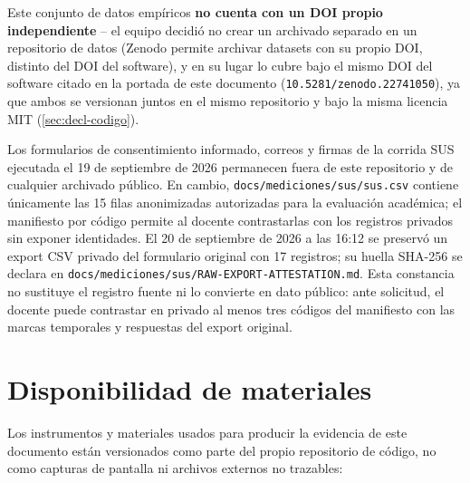Este conjunto de datos empíricos \textbf{no cuenta con un DOI propio
independiente} -- el equipo decidió no crear un archivado separado en
un repositorio de datos (Zenodo permite archivar datasets con su
propio DOI, distinto del DOI del software), y en su lugar lo cubre
bajo el mismo DOI del software citado en la portada de este documento
(\texttt{10.5281/zenodo.22741050}), ya que ambos se versionan juntos
en el mismo repositorio y bajo la misma licencia MIT
(\autoref{sec:decl-codigo}).

Los formularios de consentimiento informado, correos y firmas de la
corrida SUS ejecutada el 19 de septiembre de 2026 permanecen fuera de
este repositorio y de cualquier archivado público. En cambio,
\texttt{docs/mediciones/sus/sus.csv} contiene únicamente las 15 filas
anonimizadas autorizadas para la evaluación académica; el manifiesto por
código permite al docente contrastarlas con los registros privados sin
exponer identidades. El 20 de septiembre de 2026 a las 16:12 se preservó
un export CSV privado del formulario original con 17 registros; su huella
SHA-256 se declara en
\texttt{docs/mediciones/sus/RAW-EXPORT-ATTESTATION.md}. Esta constancia no
sustituye el registro fuente ni lo convierte en dato público: ante
solicitud, el docente puede contrastar en privado al menos tres códigos
del manifiesto con las marcas temporales y respuestas del export original.

\section{Disponibilidad de materiales}

Los instrumentos y materiales usados para producir la evidencia de este
documento están versionados como parte del propio repositorio de
código, no como capturas de pantalla ni archivos externos no
trazables:

